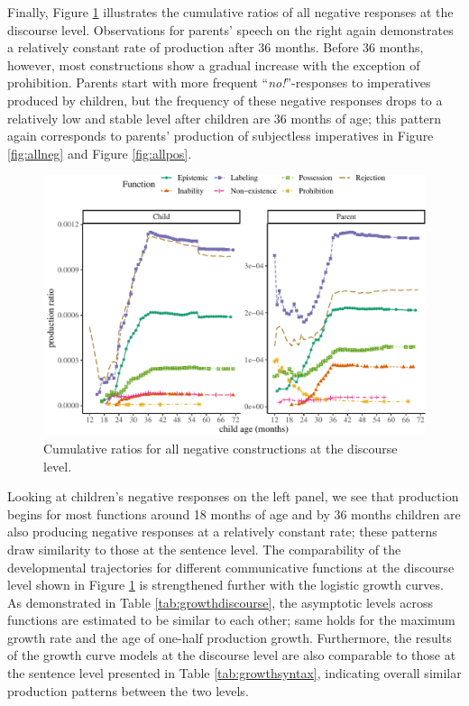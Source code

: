 \documentclass[
  english,
  man,floatsintext]{apa6}
\begin{document}
Finally, Figure \ref{fig:alldiscourse} illustrates the cumulative ratios of all negative responses at the discourse level. Observations for parents' speech on the right again demonstrates a relatively constant rate of production after 36 months. Before 36 months, however, most constructions show a gradual increase with the exception of prohibition. Parents start with more frequent ``\emph{no!}''-responses to imperatives produced by children, but the frequency of these negative responses drops to a relatively low and stable level after children are 36 months of age; this pattern again corresponds to parents' production of subjectless imperatives in Figure \ref{fig:allneg} and Figure \ref{fig:allpos}.

\begin{figure}[H]

{\centering \includegraphics{neg_construction_article_files/figure-latex/alldiscourse-1} 

}

\caption{Cumulative ratios for all negative constructions at the discourse level.}\label{fig:alldiscourse}
\end{figure}

Looking at children's negative responses on the left panel, we see that production begins for most functions around 18 months of age and by 36 months children are also producing negative responses at a relatively constant rate; these patterns draw similarity to those at the sentence level. The comparability of the developmental trajectories for different communicative functions at the discourse level shown in Figure \ref{fig:alldiscourse} is strengthened further with the logistic growth curves. As demonstrated in Table \ref{tab:growthdiscourse}, the asymptotic levels across functions are estimated to be similar to each other; same holds for the maximum growth rate and the age of one-half production growth. Furthermore, the results of the growth curve models at the discourse level are also comparable to those at the sentence level presented in Table \ref{tab:growthsyntax}, indicating overall similar production patterns between the two levels.
\end{document}
